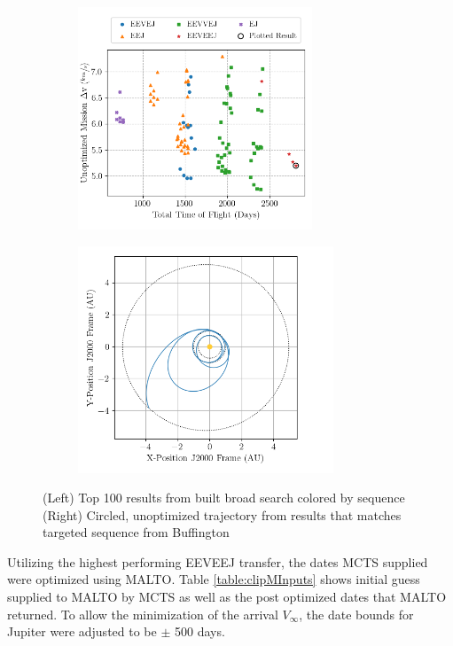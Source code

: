\documentclass[letterpaper, preprint, paper,11pt]{AAS}	%
\begin{document}
\begin{figure}[htb]
    \begin{subfigure}
        \centering\includegraphics[width=2.75in]{./fig/clipperResults.png}
    \end{subfigure}
    \begin{subfigure}
        \centering\includegraphics[width=3in]{./fig/clipperMCTS.png}
    \end{subfigure}
    \caption{(Left) Top 100 results from built broad search colored by sequence\hspace{1em} (Right) Circled, unoptimized trajectory from results that matches targeted sequence from Buffington \cite{Buffington2014}}
    \label{fig:clipResults}
\end{figure}

Utilizing the highest performing EEVEEJ transfer, the dates MCTS supplied were optimized using MALTO. Table \ref*{table:clipMInputs} shows initial guess supplied to MALTO by MCTS as well as the post optimized dates that MALTO returned. To allow the minimization of the arrival $V_\infty$, the date bounds for Jupiter were adjusted to be $\pm$ 500 days. 
\end{document}
